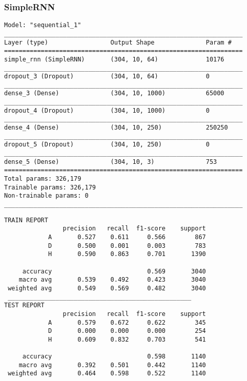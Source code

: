 \subsubsection*{SimpleRNN}
\begin{lstlisting}[style=arch]
Model: "sequential_1"
_________________________________________________________________
Layer (type)                 Output Shape              Param #   
=================================================================
simple_rnn (SimpleRNN)       (304, 10, 64)             10176     
_________________________________________________________________
dropout_3 (Dropout)          (304, 10, 64)             0         
_________________________________________________________________
dense_3 (Dense)              (304, 10, 1000)           65000     
_________________________________________________________________
dropout_4 (Dropout)          (304, 10, 1000)           0         
_________________________________________________________________
dense_4 (Dense)              (304, 10, 250)            250250    
_________________________________________________________________
dropout_5 (Dropout)          (304, 10, 250)            0         
_________________________________________________________________
dense_5 (Dense)              (304, 10, 3)              753       
=================================================================
Total params: 326,179
Trainable params: 326,179
Non-trainable params: 0
_________________________________________________________________
\end{lstlisting}
\begin{lstlisting}[style=report]
TRAIN REPORT
                precision   recall  f1-score    support
            A       0.527    0.611     0.566        867
            D       0.500    0.001     0.003        783
            H       0.590    0.863     0.701       1390

     accuracy                          0.569       3040
    macro avg       0.539    0.492     0.423       3040
 weighted avg       0.549    0.569     0.482       3040
 __________________________________________________
TEST REPORT
                precision   recall  f1-score    support
            A       0.579    0.672     0.622        345
            D       0.000    0.000     0.000        254
            H       0.609    0.832     0.703        541

     accuracy                          0.598       1140
    macro avg       0.392    0.501     0.442       1140
 weighted avg       0.464    0.598     0.522       1140
\end{lstlisting}


